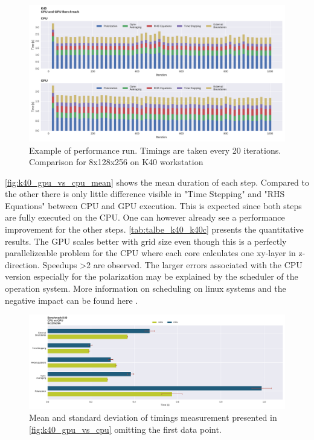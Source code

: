 \documentclass[master.tex]{subfiles}
\begin{document}
\begin{figure}[!hbtp]
    \centering
    \includegraphics[width=\linewidth]{pdfs/k40CPUvsGPU_full.pdf}
    \caption{\small Example of performance run. Timings are taken every 20 iterations. Comparison for 8x128x256 on K40 workstation}
    \label{fig:k40_gpu_vs_cpu}
\end{figure}

\autoref{fig:k40_gpu_vs_cpu_mean} shows the mean duration of each step. Compared to the other there is only little difference visible in "Time Stepping" and "RHS Equations" between CPU and GPU execution. This is expected since both steps are fully executed on the CPU. One can however already see a performance improvement for the other steps. \autoref{tab:talbe_k40_k40c} presents the quantitative results. The GPU scales better with grid size even though this is a perfectly parallelizeable problem for the CPU where each core calculates one xy-layer in z-direction. Speedups >2 are observed.
The larger errors associated with the CPU version especially for the polarization may be explained by the scheduler of the operation system. More information on scheduling on linux systems and the negative impact can be found here \cite{Scheduling-Linux}.

\begin{figure}[!hbtp]
    \centering
    \includegraphics[width=\linewidth]{pdfs/k40CPUvsGPU_means.pdf}
    \caption{\small Mean and standard deviation of timings measurement presented in \autoref{fig:k40_gpu_vs_cpu} omitting the first data point.}
    \label{fig:k40_gpu_vs_cpu_mean}
\end{figure}
\end{document}
